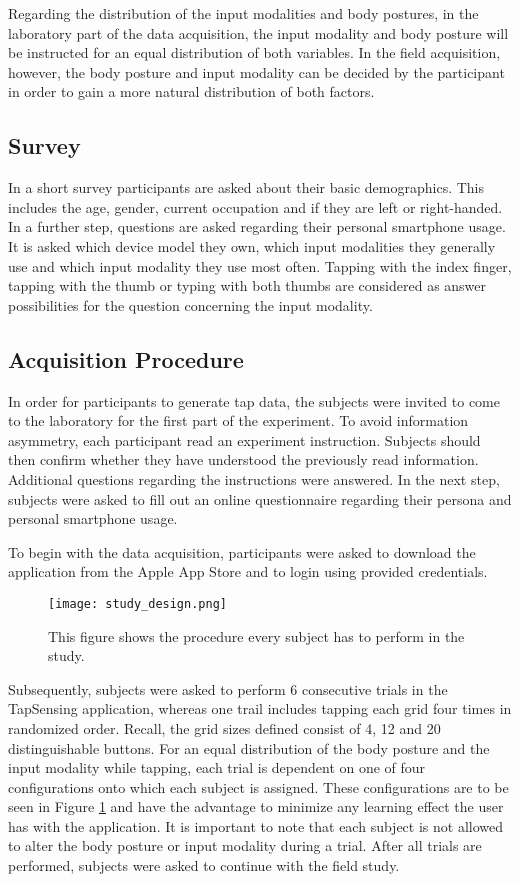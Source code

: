 Regarding the distribution of the input modalities and body postures, in the laboratory part of the data acquisition, the input modality and body posture will be instructed for an equal distribution of both variables. In the field acquisition, however, the body posture and input modality can be decided by the participant in order to gain a more natural distribution of both factors.

\subsection{Survey}
In a short survey participants are asked about their basic demographics. This includes the age, gender, current occupation and if they are left or right-handed. In a further step, questions are asked regarding their personal smartphone usage. It is asked which device model they own, which input modalities they generally use and which input modality they use most often. Tapping with the index finger, tapping with the thumb or typing with both thumbs are considered as answer possibilities for the question concerning the input modality.

\subsection{Acquisition Procedure}
In order for participants to generate tap data, the subjects were invited to come to the laboratory for the first part of the experiment. To avoid information asymmetry, each participant read an experiment instruction. Subjects should then confirm whether they have understood the previously read information. Additional questions regarding the instructions were answered. In the next step, subjects were asked to fill out an online questionnaire regarding their persona and personal smartphone usage.

To begin with the data acquisition, participants were asked to download the application from the Apple App Store and to login using provided credentials.

\begin{figure}[h!]
  \centering
  \texttt{[image: study\_design.png]}
  \caption{This figure shows the procedure every subject has to perform in the study.} \label{fig:study_design}
\end{figure}

Subsequently, subjects were asked to perform 6 consecutive trials in the TapSensing application, whereas one trail includes tapping each grid four times in randomized order. Recall, the grid sizes defined consist of 4, 12 and 20 distinguishable buttons. For an equal distribution of the body posture and the input modality while tapping, each trial is dependent on one of four configurations onto which each subject is assigned. These configurations are to be seen in Figure \ref{fig:study_design} and have the advantage to minimize any learning effect the user has with the application. It is important to note that each subject is not allowed to alter the body posture or input modality during a trial. After all trials are performed, subjects were asked to continue with the field study.

